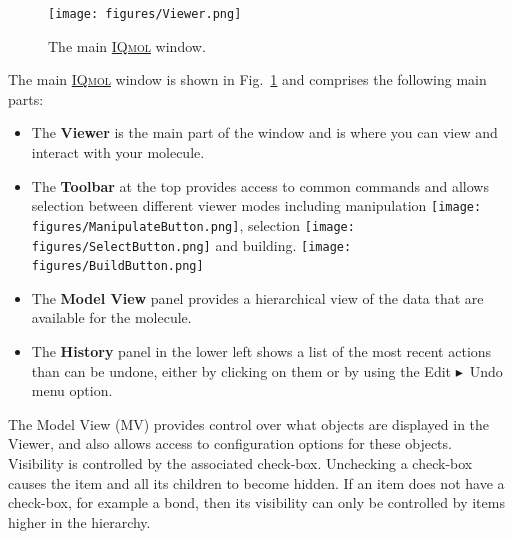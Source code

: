 \documentclass[a4paper,12pt]{article}
\newcommand{\iqmol}{\href{http://iqmol.org}{{\scshape IQmol}}}
\newcommand{\bt}{\ensuremath{\blacktriangleright}}
\begin{document}
\begin{figure}[ht]
\begin{center}
\texttt{[image: figures/Viewer.png]}
\caption{The main \iqmol{} window.}
\label{fig:main}
\end{center}
\end{figure}
The main \iqmol{} window is shown in Fig.~\ref{fig:main} and comprises the
following main parts:
\begin{itemize}
\item The {\bf Viewer} is the main part of the window and is where you can
      view and interact with your molecule.
\item The {\bf Toolbar} at the top provides access to common commands and allows selection
      between different viewer modes including manipulation 
      \texttt{[image: figures/ManipulateButton.png]}, selection 
      \texttt{[image: figures/SelectButton.png]} and building.
      \texttt{[image: figures/BuildButton.png]}
\item The {\bf Model View} panel provides a hierarchical view of the data that
      are available for the molecule.
\item The {\bf History} panel in the lower left shows a list of the most recent
      actions than can be undone, either by clicking on them or by using the
      Edit \bt\ Undo menu option. 
\end{itemize}

The Model View (MV) provides control over what objects are displayed in the Viewer,
and also allows access to configuration options for these objects.  Visibility is
controlled by the associated check-box.  Unchecking a check-box causes the item
and all its children to become hidden.  If an item does not have a check-box,
for example a bond, then its visibility can only be controlled by items higher
in the hierarchy.  
\end{document}
